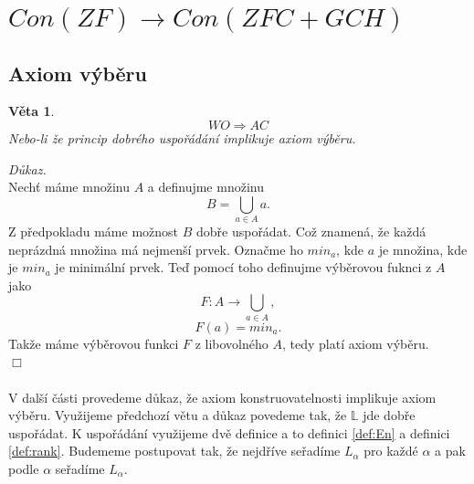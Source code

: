 \documentclass[12pt,a4paper]{article}
\newtheorem{veta}{V\v{e}ta}[section]%
\newenvironment{proof}
{\noindent \textit{D\r{u}kaz.}}
{\hspace*{\fill} $\Box$}
\begin{document}
\section{$ Con(ZF) \rightarrow Con(ZFC + GCH) $}
\subsection{Axiom v\'{y}b\v{e}ru}
\begin{veta}
\[ WO \Rightarrow AC \]
Nebo-li \v{z}e princip dobr\'{e}ho uspo\v{r}\'{a}d\'{a}n\'{i} implikuje axiom v\'{y}b\v{e}ru.
\label{vet:WOAC}
\end{veta}
\begin{proof}~\\
Nech\v{t} m\'{a}me mno\v{z}inu $ A $ a  definujme mno\v{z}inu 
\[ B=\bigcup_{a \in A} a .\]
Z p\v{r}edpokladu m\'{a}me mo\v{z}nost $ B $ dob\v{r}e uspo\v{r}\'{a}dat. Co\v{z} znamen\'{a}, \v{z}e ka\v{z}d\'{a} nepr\'{a}zdn\'{a} mno\v{z}ina m\'{a} nejmen\v{s}\'{i} prvek. Ozna\v{c}me ho $ min_a $, kde $ a $ je mno\v{z}ina, kde je  $ min_a $ je minim\'{a}ln\'{i} prvek. Te\v{d} pomoc\'{i} toho definujme v\'{y}b\v{e}rovou fuknci z $ A $ jako
\[ F: A \rightarrow \bigcup_{a \in A} , \]
\[ F(a)=min_a .\]
Tak\v{z}e m\'{a}me v\'{y}b\v{e}rovou funkci $ F $ z libovoln\'{e}ho $ A $, tedy plat\'{i} axiom v\'{y}b\v{e}ru.~\\
\end{proof}~\\~\\
V dal\v{s}\'{i} \v{c}\'{a}sti provedeme d\r{u}kaz, \v{z}e axiom konstruovatelnosti implikuje axiom v\'{y}b\v{e}ru. Vyu\v{z}ijeme p\v{r}edchoz\'{i} v\v{e}tu a d\r{u}kaz povedeme tak, \v{z}e $ \mathbb{L}  $ jde dob\v{r}e uspo\v{r}\'{a}dat. K uspo\v{r}\'{a}d\'{a}n\'{i} vyu\v{z}ijeme dv\v{e} definice a to definici \ref{def:En} a definici \ref{def:rank}. Budememe postupovat tak, \v{z}e nejd\v{r}\'{i}ve se\v{r}ad\'{i}me $ L_\alpha $ pro ka\v{z}d\'{e} $ \alpha $ a pak podle $ \alpha $ se\v{r}ad\'{i}me $ L_\alpha $.
\end{document}
